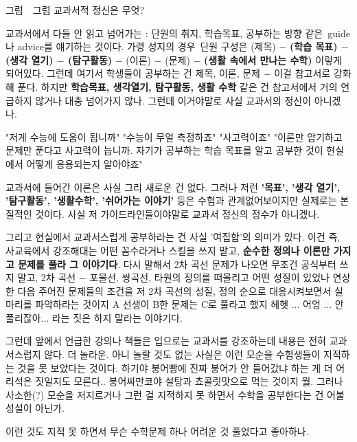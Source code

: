 그럼  그럼 교과서적 정신은 무엇?
\vspace{5mm}

교과서에서 다들 안 읽고 넘어가는 : 단원의 취지, 학습목표, 공부하는 방향 같은 guide나 advice를 얘기하는 것이다.
가령 성지의 경우 단원 구성은
(제목) $-$ \textbf{(학습 목표) $-$ (생각 열기) $-$ (탐구활동)} $-$ (이론) $-$ (문제) $-$ \textbf{(생활 속에서 만나는 수학)}
이렇게 되어있다.
그런데 여기서 학생들이 공부하는 건 제목, 이론, 문제 $-$ 이걸 참고서로 강화해 푼다.
하지만 \textbf{학습목표, 생각열기, 탐구활동, 생활 수학} 같은 건 참고서에서 거의 언급하지 않거나 대충 넘어가지 않나.
그런데 이거야말로 사실 교과서의 정신이 아니겠나.
\vspace{5mm}

"저게 수능에 도움이 됩니까"
"수능이 무얼 측정하죠"
"사고력이죠"
"이론만 암기하고 문제만 푼다고 사고력이 늡니까. 자기가 공부하는 학습 목표를 알고 공부한 것이 현실에서 어떻게 응용되는지 알아야죠"
\vspace{5mm}

교과서에 들어간 이론은 사실 그리 새로운 건 없다.
그러나 저런 \textbf{'목표', '생각 열기', '탐구활동', '생활수학', '쉬어가는 이야기'} 등은 수험과 관계없어보이지만 실제로는 본질적인 것이다.
사실 저 가이드라인들이야말로 교과서 정신의 정수가 아니겠나.
\vspace{5mm}

그리고 현실에서 교과서스럽게 공부하라는 건 사실 '여집합'의 의미가 있다.
이건 즉, 사교육에서 강조해대는 어떤 꼼수라거나 스킬을 쓰지 말고, \textbf{순수한 정의나 이론만 가지고 문제를 풀라 그 이야기다}.
다시 말해서 2차 곡선 문제가 나오면 무조건 공식부터 쓰지 말고,
2차 곡선 $-$ 포물선, 쌍곡선, 타원의 정의를 떠올리고 어떤 성질이 있었나 연상한 다음
주어진 문제들의 조건을 저 2차 곡선의 성질, 정의 순으로 대응시켜보면서 실마리를 파악하라는 것이지
A 선생이 B한 문제는 C로 풀라고 했지 헤헷 ... 어엉 ... 안 풀리잖아... 라는 짓은 하지 말라는 이야기다.
\vspace{5mm}

그런데 앞에서 언급한 강의나 책들은 입으로는 교과서를 강조하는데 내용은 전혀 교과서스럽지 않다.
더 놀라운. 아니 놀랄 것도 없는 사실은 이런 모순을 수험생들이 지적하는 것을 못 보았다는 것이다.
하기야 붕어빵에 진짜 붕어가 안 들어갔냐 하는 게 더 어리석은 짓일지도 모른다.. 붕어싸만코야 설탕과 쵸콜릿맛으로 먹는 것이지 뭘.
그러나 사소한(?) 모순을 저지르거나 그런 걸 지적하지 못 하면서 수학을 공부한다는 건 어불성설이 아닌가.
\vspace{5mm}

이런 것도 지적 못 하면서 무슨 수학문제 하나 어려운 것 풀었다고 좋아하나.
\vspace{5mm}

